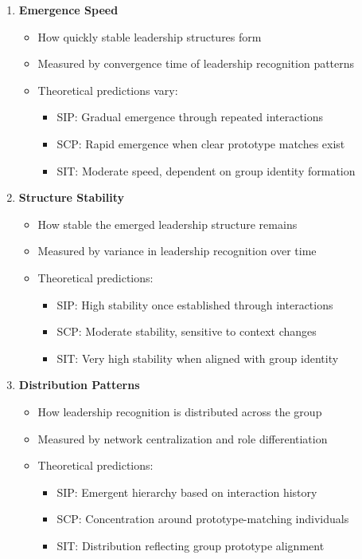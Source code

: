 \documentclass[12pt]{article}
\begin{document}
\begin{enumerate}
    \item \textbf{Emergence Speed}
    \begin{itemize}
        \item How quickly stable leadership structures form
        \item Measured by convergence time of leadership recognition patterns
        \item Theoretical predictions vary:
            \begin{itemize}
                \item SIP: Gradual emergence through repeated interactions
                \item SCP: Rapid emergence when clear prototype matches exist
                \item SIT: Moderate speed, dependent on group identity formation
            \end{itemize}
    \end{itemize}

    \item \textbf{Structure Stability}
    \begin{itemize}
        \item How stable the emerged leadership structure remains
        \item Measured by variance in leadership recognition over time
        \item Theoretical predictions:
            \begin{itemize}
                \item SIP: High stability once established through interactions
                \item SCP: Moderate stability, sensitive to context changes
                \item SIT: Very high stability when aligned with group identity
            \end{itemize}
    \end{itemize}

    \item \textbf{Distribution Patterns}
    \begin{itemize}
        \item How leadership recognition is distributed across the group
        \item Measured by network centralization and role differentiation
        \item Theoretical predictions:
            \begin{itemize}
                \item SIP: Emergent hierarchy based on interaction history
                \item SCP: Concentration around prototype-matching individuals
                \item SIT: Distribution reflecting group prototype alignment
            \end{itemize}
    \end{itemize}
\end{enumerate}
\end{document}
